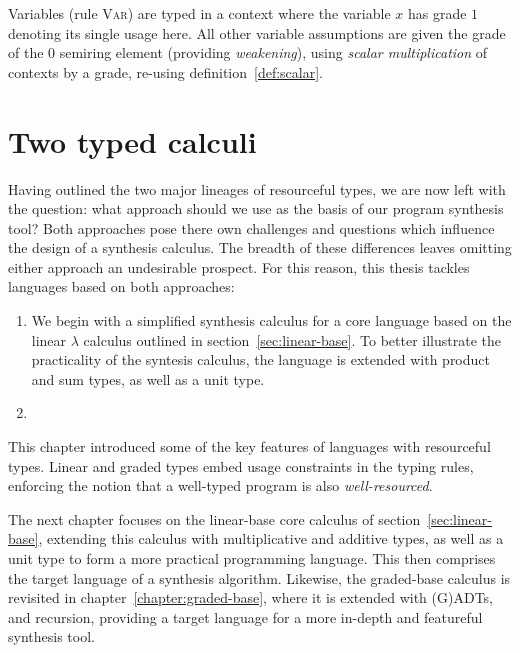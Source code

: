 Variables (rule \textsc{Var}) are
typed in a context where the variable $x$ has grade $1$ denoting its
single usage here. All other variable assumptions are given the grade
of the $0$ semiring element (providing \emph{weakening}),
using \textit{scalar multiplication} of contexts by a grade, re-using definition~\eqref{def:scalar}.


\section{Two typed calculi}


Having outlined the two major lineages of resourceful types, we
are now left with the question: what approach should we use as the basis of our
program synthesis tool? Both approaches pose there own challenges and questions
which influence the design of a synthesis calculus. The breadth of these
differences leaves omitting either approach an undesirable prospect. For this
reason, this thesis tackles languages based on both approaches:

\begin{enumerate}
        \item We begin with a simplified synthesis calculus for a core language
        based on the linear $\lambda$ calculus outlined in
        section~\eqref{sec:linear-base}. To better illustrate the practicality
        of the syntesis calculus, the language is extended with product
        and sum types, as well as a unit type.
        \item
\end{enumerate}




This chapter introduced some of the key features of languages with resourceful
types. Linear and graded types embed usage constraints in the typing rules,
enforcing the notion that a well-typed program is also \textit{well-resourced}.

The next chapter focuses on the linear-base core calculus of
section~\ref{sec:linear-base}, extending this calculus with multiplicative and additive
types, as well as a unit type to form a more practical programming language. This
then comprises the target language of a synthesis algorithm. Likewise, the graded-base
calculus is revisited in chapter~\ref{chapter:graded-base}, where it is extended
with (G)ADTs, and recursion, providing a target language for a more in-depth and
featureful synthesis tool.
